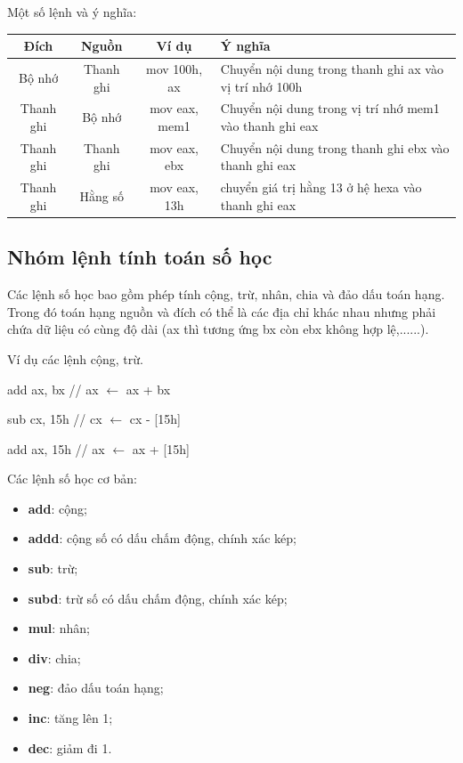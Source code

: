 Một số lệnh và ý nghĩa:

\begin{table}
    \centering
    \begin{tabular}{ | c | c | c | p{} | } 
    \hline
    Đích & Nguồn & Ví dụ & Ý nghĩa \\ 
    \hline
    Bộ nhớ & Thanh ghi & mov 100h, ax & Chuyển nội dung trong thanh ghi ax vào vị trí nhớ 100h \\ 
    \hline
    Thanh ghi & Bộ nhớ & mov eax, mem1 & Chuyển nội dung trong vị trí nhớ mem1 vào thanh ghi eax \\ 
    \hline
    Thanh ghi & Thanh ghi & mov eax, ebx & Chuyển nội dung trong thanh ghi ebx vào thanh ghi eax \\
    \hline
    Thanh ghi & Hằng số & mov eax, 13h & chuyển giá trị hằng 13 ở hệ hexa vào thanh ghi eax \\
    \hline
    \end{tabular}
\end{table}

\subsection*{Nhóm lệnh tính toán số học}

Các lệnh số học bao gồm phép tính cộng, trừ, nhân, chia và đảo dấu toán hạng. Trong đó toán hạng nguồn và đích có thể là các địa chỉ khác nhau nhưng phải chứa dữ liệu có cùng độ dài (ax thì tương ứng bx còn ebx không hợp lệ,......). 

\begin{example}
    Ví dụ các lệnh cộng, trừ.

    add ax, bx // ax $\leftarrow$ ax + bx

    sub cx, 15h // cx $\leftarrow$ cx - [15h]

    add ax, 15h // ax $\leftarrow$ ax + [15h]
\end{example}

Các lệnh số học cơ bản:

\begin{itemize}
    \item \textbf{add}: cộng;
    \item \textbf{addd}: cộng số có dấu chấm động, chính xác kép;
    \item \textbf{sub}: trừ;
    \item \textbf{subd}: trừ số có dấu chấm động, chính xác kép;
    \item \textbf{mul}: nhân;
    \item \textbf{div}: chia;
    \item \textbf{neg}: đảo dấu toán hạng;
    \item \textbf{inc}: tăng lên 1;
    \item \textbf{dec}: giảm đi 1.
\end{itemize}

